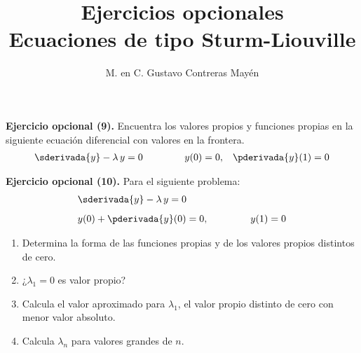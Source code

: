
\title{Ejercicios opcionales \\[0.3em]  \large{Ecuaciones de tipo Sturm-Liouville} \vspace{-3ex}}
\author{M. en C. Gustavo Contreras Mayén}
\date{ }


\vspace{-4cm}
\maketitle
\fontsize{14}{14}\selectfont

\noindent
\textbf{Ejercicio opcional (9).} Encuentra los valores propios y funciones propias en la siguiente ecuación diferencial con valores en la frontera.
\begin{align*}
\sderivada{y} - \lambda \, y = 0 \hspace{1.5cm} y(0) = 0, \hspace{0.3cm} \pderivada{y}(1) = 0
\end{align*}

\noindent
\textbf{Ejercicio opcional (10).} Para el siguiente problema:
\begin{align*}
&\sderivada{y} - \lambda \, y = 0 \\[0.5em]
&y(0) + \pderivada{y}(0) = 0, \hspace{1.5cm} y(1) = 0
\end{align*}
\begin{enumerate}[label=\alph*)]
\item Determina la forma de las funciones propias y de los valores propios distintos de cero.
\item ¿$\lambda_{1} = 0$ es valor propio?
\item Calcula el valor aproximado para $\lambda_{1}$, el valor propio distinto de cero con menor valor absoluto.
\item Calcula $\lambda_{n}$ para valores grandes de $n$.
\end{enumerate}
